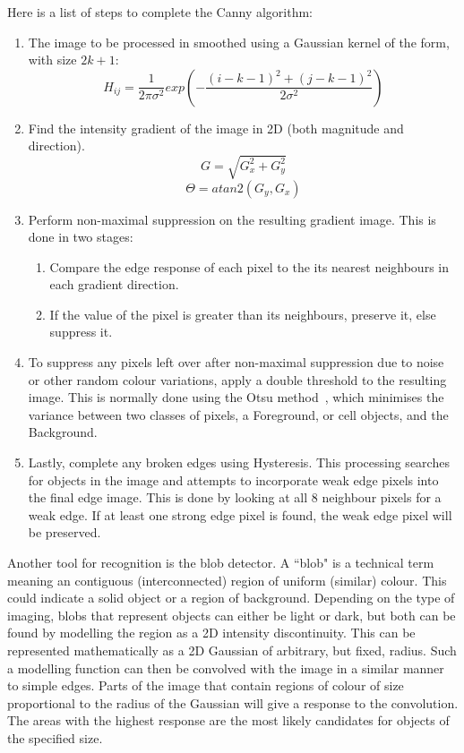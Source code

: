Here is a list of steps to complete the Canny algorithm:
\begin{enumerate}
	\item The image to be processed in smoothed using a Gaussian kernel of the form, with size $2k + 1$:
	$$ H_{ij} = \frac{1}{2 \pi \sigma^2} exp \left( -\frac{(i - k - 1)^2 + (j - k - 1)^2}{2 \sigma^2} \right) $$
	\item Find the intensity gradient of the image in 2D (both magnitude and direction).
	$$ G = \sqrt{G^2_x + G^2_y} $$
	$$ \Theta = atan2(G_y, G_x) $$
	\item Perform non-maximal suppression on the resulting gradient image. This is done in two stages:
	\begin{enumerate}
		\item Compare the edge response of each pixel to the its nearest neighbours in each gradient direction.
		\item If the value of the pixel is greater than its neighbours, preserve it, else suppress it.
	\end{enumerate}
	\item To suppress any pixels left over after non-maximal suppression due to noise or other random colour variations, apply a double threshold to the resulting image. This is normally done using the Otsu method~\cite{}, which minimises the variance between two classes of pixels, a Foreground, or cell objects, and the Background.
	\item Lastly, complete any broken edges using Hysteresis. This processing searches for objects in the image and attempts to incorporate weak edge pixels into the final edge image. This is done by looking at all 8 neighbour pixels for a weak edge. If at least one strong edge pixel is found, the weak edge pixel will be preserved.
\end{enumerate}

Another tool for recognition is the blob detector. A ``blob" is a technical term meaning an contiguous (interconnected) region of uniform (similar) colour. This could indicate a solid object or a region of background. Depending on the type of imaging, blobs that represent objects can either be light or dark, but both can be found by modelling the region as a 2D intensity discontinuity. This can be represented mathematically as a 2D Gaussian of arbitrary, but fixed, radius. Such a modelling function can then be convolved with the image in a similar manner to simple edges. Parts of the image that contain regions of colour of size proportional to the radius of the Gaussian will give a response to the convolution. The areas with the highest response are the most likely candidates for objects of the specified size.

